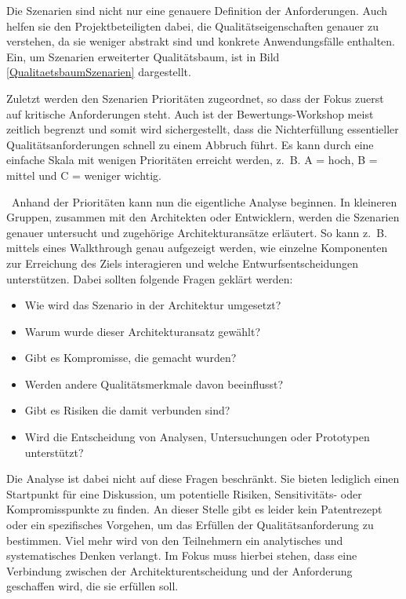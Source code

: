 Die Szenarien sind nicht nur eine genauere Definition der Anforderungen. Auch helfen sie den Projektbeteiligten dabei, die Qualitätseigenschaften genauer zu verstehen, da sie weniger abstrakt sind und konkrete Anwendungsfälle enthalten. Ein, um Szenarien erweiterter Qualitätsbaum, ist in Bild \ref{QualitaetsbaumSzenarien} dargestellt.


Zuletzt werden den Szenarien Prioritäten zugeordnet, so dass der Fokus zuerst auf kritische Anforderungen steht. Auch ist der Bewertungs-Workshop meist zeitlich begrenzt und somit wird sichergestellt, dass die Nichterfüllung essentieller Qualitätsanforderungen schnell zu einem Abbruch führt. Es kann durch eine einfache Skala mit wenigen Prioritäten erreicht werden, z.~B. A = hoch, B = mittel und C = weniger wichtig.

\
Anhand der Prioritäten kann nun die eigentliche Analyse beginnen. In kleineren Gruppen, zusammen mit den Architekten oder Entwicklern, werden die Szenarien genauer untersucht und zugehörige Architekturansätze erläutert.
So kann z.~B. mittels eines Walkthrough genau aufgezeigt werden, wie einzelne Komponenten zur Erreichung des Ziels interagieren und welche Entwurfsentscheidungen unterstützen\cite{Starke2015}. Dabei sollten folgende Fragen geklärt werden: 

\begin{itemize}
	\item Wie wird das Szenario in der Architektur umgesetzt?
	\item Warum wurde dieser Architekturansatz gewählt?
	\item Gibt es Kompromisse, die gemacht wurden?
	\item Werden andere Qualitätsmerkmale davon beeinflusst?
	\item Gibt es Risiken die damit verbunden sind?
	\item Wird die Entscheidung von Analysen, Untersuchungen oder Prototypen unterstützt?
\end{itemize}

Die Analyse ist dabei nicht auf diese Fragen beschränkt. Sie bieten lediglich einen Startpunkt für eine Diskussion, um potentielle Risiken, Sensitivitäts- oder Kompromisspunkte zu finden. An dieser Stelle gibt es leider kein Patentrezept oder ein spezifisches Vorgehen, um das Erfüllen der Qualitätsanforderung zu bestimmen. Viel mehr wird von den Teilnehmern ein analytisches und systematisches Denken verlangt. Im Fokus muss hierbei stehen, dass eine Verbindung zwischen der Architekturentscheidung und der Anforderung geschaffen wird, die sie erfüllen soll.

